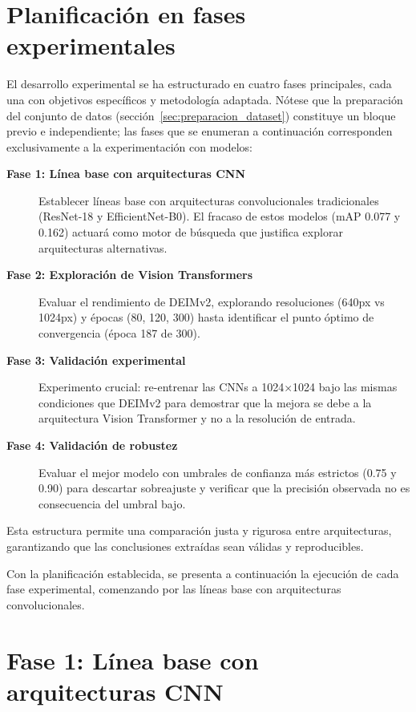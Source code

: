 \section{Planificación en fases experimentales}
\label{sec:planificacion}

El desarrollo experimental se ha estructurado en cuatro fases principales, cada una con objetivos específicos y metodología adaptada. Nótese que la preparación del conjunto de datos (sección~\ref{sec:preparacion_dataset}) constituye un bloque previo e independiente; las fases que se enumeran a continuación corresponden exclusivamente a la experimentación con modelos:

\begin{description}
    \item[\textbf{Fase 1: Línea base con arquitecturas CNN}] Establecer líneas base con arquitecturas convolucionales tradicionales (ResNet-18 y EfficientNet-B0). El fracaso de estos modelos (mAP 0.077 y 0.162) actuará como motor de búsqueda que justifica explorar arquitecturas alternativas.
    
    \item[\textbf{Fase 2: Exploración de Vision Transformers}] Evaluar el rendimiento de DEIMv2, explorando resoluciones (640px vs 1024px) y épocas (80, 120, 300) hasta identificar el punto óptimo de convergencia (época 187 de 300).
    
    \item[\textbf{Fase 3: Validación experimental}] Experimento crucial: re-entrenar las CNNs a 1024×1024 bajo las mismas condiciones que DEIMv2 para demostrar que la mejora se debe a la arquitectura Vision Transformer y no a la resolución de entrada.
    
    \item[\textbf{Fase 4: Validación de robustez}] Evaluar el mejor modelo con umbrales de confianza más estrictos (0.75 y 0.90) para descartar sobreajuste y verificar que la precisión observada no es consecuencia del umbral bajo.
\end{description}

Esta estructura permite una comparación justa y rigurosa entre arquitecturas, garantizando que las conclusiones extraídas sean válidas y reproducibles.

Con la planificación establecida, se presenta a continuación la ejecución de cada fase experimental, comenzando por las líneas base con arquitecturas convolucionales.

\section{Fase 1: Línea base con arquitecturas CNN}
\label{sec:fase1}

